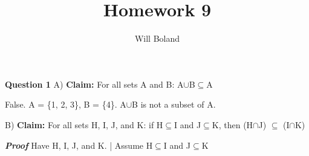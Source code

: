 \documentclass{article}
\begin{document}
\title{Homework 9}
\author{Will Boland}
\maketitle

\textbf{Question 1}\newline
A) \textbf{Claim: } For all sets A and B: A$\cup$B$\subseteq$A\newline

False. A = \{1, 2, 3\}, B = \{4\}. A$\cup$B is not a subset of A.\newline\newline


B) \textbf{Claim: } For all sets H, I, J, and K: if H$\subseteq$I and J$\subseteq$K, then (H$\cap$J) $\subseteq$ (I$\cap$K) \newline

\textbf{\textit{Proof}}\newline
Have H, I, J, and K.\newline
|	Assume H$\subseteq$I and J$\subseteq$K\newline


\enddocument
\end{document}
